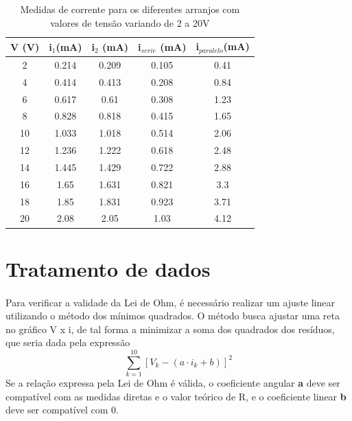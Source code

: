 \documentclass[11pt,a4paper]{article}
\begin{document}
      \begin{table}[htb!]
        \centering
        \begin{tabular}{c|cccc}
          \toprule
          V (V) & i$_1$(mA) & i$_2$ (mA) & i$_{serie}$ (mA) & i$_{paralelo}$(mA) \\
          \midrule
          2     & 0.214   & 0.209   & 0.105        & 0.41            \\
          4     & 0.414   & 0.413   & 0.208        & 0.84            \\
          6     & 0.617   & 0.61    & 0.308        & 1.23            \\
          8     & 0.828   & 0.818   & 0.415        & 1.65            \\
          10    & 1.033   & 1.018   & 0.514        & 2.06            \\
          12    & 1.236   & 1.222   & 0.618        & 2.48            \\
          14    & 1.445   & 1.429   & 0.722        & 2.88            \\
          16    & 1.65    & 1.631   & 0.821        & 3.3             \\
          18    & 1.85    & 1.831   & 0.923        & 3.71            \\
          20    & 2.08    & 2.05    & 1.03         & 4.12            \\
          \bottomrule
        \end{tabular}
        \caption{Medidas de corrente para os diferentes arranjos com valores de tensão variando de 2 a 20V}
        \label{tab:indiretas}
      \end{table}

  \pagebreak
  \section{Tratamento de dados}

    \paragraph{}
    Para verificar a validade da Lei de Ohm, é necessário realizar um ajuste linear utilizando o método dos mínimos quadrados. O método busca ajustar uma reta no gráfico V x i, de tal forma a minimizar a soma dos quadrados dos resíduos, que seria dada pela expressão $$\sum\limits_{k=1}^{10}[V_k - (a \cdot i_k + b)]^2$$ Se a relação expressa pela Lei de Ohm é válida, o coeficiente angular \textbf{a} deve ser compatível com as medidas diretas e o valor teórico de R, e o coeficiente linear \textbf{b} deve ser compatível com 0.
\end{document}
